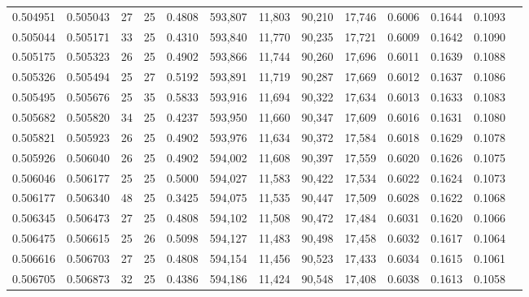 \begin{tabular}{rrrrrrrrrrrrr}
0.504951 & 0.505043 &    27 &  25 &                                     0.4808 & 593,807 &  11,803 &  90,210 &  17,746 & 0.6006 & 0.1644 & 0.1093 \\
0.505044 & 0.505171 &    33 &  25 &                                     0.4310 & 593,840 &  11,770 &  90,235 &  17,721 & 0.6009 & 0.1642 & 0.1090 \\
0.505175 & 0.505323 &    26 &  25 &                                     0.4902 & 593,866 &  11,744 &  90,260 &  17,696 & 0.6011 & 0.1639 & 0.1088 \\
0.505326 & 0.505494 &    25 &  27 &                                     0.5192 & 593,891 &  11,719 &  90,287 &  17,669 & 0.6012 & 0.1637 & 0.1086 \\
0.505495 & 0.505676 &    25 &  35 &                                     0.5833 & 593,916 &  11,694 &  90,322 &  17,634 & 0.6013 & 0.1633 & 0.1083 \\
0.505682 & 0.505820 &    34 &  25 &                                     0.4237 & 593,950 &  11,660 &  90,347 &  17,609 & 0.6016 & 0.1631 & 0.1080 \\
0.505821 & 0.505923 &    26 &  25 &                                     0.4902 & 593,976 &  11,634 &  90,372 &  17,584 & 0.6018 & 0.1629 & 0.1078 \\
0.505926 & 0.506040 &    26 &  25 &                                     0.4902 & 594,002 &  11,608 &  90,397 &  17,559 & 0.6020 & 0.1626 & 0.1075 \\
0.506046 & 0.506177 &    25 &  25 &                                     0.5000 & 594,027 &  11,583 &  90,422 &  17,534 & 0.6022 & 0.1624 & 0.1073 \\
0.506177 & 0.506340 &    48 &  25 &                                     0.3425 & 594,075 &  11,535 &  90,447 &  17,509 & 0.6028 & 0.1622 & 0.1068 \\
0.506345 & 0.506473 &    27 &  25 &                                     0.4808 & 594,102 &  11,508 &  90,472 &  17,484 & 0.6031 & 0.1620 & 0.1066 \\
0.506475 & 0.506615 &    25 &  26 &                                     0.5098 & 594,127 &  11,483 &  90,498 &  17,458 & 0.6032 & 0.1617 & 0.1064 \\
0.506616 & 0.506703 &    27 &  25 &                                     0.4808 & 594,154 &  11,456 &  90,523 &  17,433 & 0.6034 & 0.1615 & 0.1061 \\
0.506705 & 0.506873 &    32 &  25 &                                     0.4386 & 594,186 &  11,424 &  90,548 &  17,408 & 0.6038 & 0.1613 & 0.1058 \\

\end{tabular}
